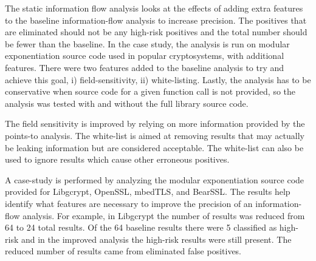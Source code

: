   The static information flow analysis looks at the effects of adding extra
  features to the baseline information-flow analysis to increase precision. The
  positives that are eliminated should not be any high-risk positives and the
  total number should be fewer than the baseline. In the case study, the
  analysis is run on modular exponentiation source code used in popular
  cryptosystems, with additional features. There were two features added to the
  baseline analysis to try and achieve this goal, i) field-sensitivity, ii)
  white-listing. Lastly, the analysis has to be conservative when source code
  for a given function call is not provided, so the analysis was tested with and
  without the full library source code.
  
  The field sensitivity is improved by relying on more information provided by
  the points-to analysis. The white-list is aimed at removing results that may
  actually be leaking information but are considered acceptable. The white-list
  can also be used to ignore results which cause other erroneous positives. 

  A case-study is performed by analyzing the modular exponentiation source code
  provided for Libgcrypt, OpenSSL, mbedTLS, and BearSSL. The results help
  identify what features are necessary to improve the precision of an
  information-flow analysis. For example, in Libgcrypt the number of results was
  reduced from 64 to 24 total results. Of the 64 baseline results there were 5
  classified as high-risk and in the improved analysis the high-risk results
  were still present. The reduced number of results came from eliminated false
  positives.
